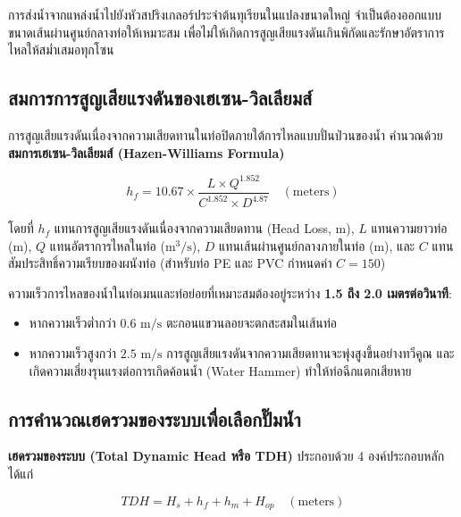 การส่งน้ำจากแหล่งน้ำไปยังหัวสปริงเกลอร์ประจำต้นทุเรียนในแปลงขนาดใหญ่ จำเป็นต้องออกแบบขนาดเส้นผ่านศูนย์กลางท่อให้เหมาะสม เพื่อไม่ให้เกิดการสูญเสียแรงดันเกินพิกัดและรักษาอัตราการไหลให้สม่ำเสมอทุกโซน

\subsection{สมการการสูญเสียแรงดันของเฮเซน-วิลเลียมส์}

การสูญเสียแรงดันเนื่องจากความเสียดทานในท่อปิดภายใต้การไหลแบบปั่นป่วนของน้ำ คำนวณด้วย \textbf{สมการเฮเซน-วิลเลียมส์ (Hazen-Williams Formula)}

\begin{equation}
h_f = 10.67 \times \frac{L \times Q^{1.852}}{C^{1.852} \times D^{4.87}} \quad (\text{meters})
\label{eq:hazen_williams}
\end{equation}

โดยที่ $h_f$ แทนการสูญเสียแรงดันเนื่องจากความเสียดทาน (Head Loss, m), $L$ แทนความยาวท่อ (m), $Q$ แทนอัตราการไหลในท่อ ($\text{m}^3/\text{s}$), $D$ แทนเส้นผ่านศูนย์กลางภายในท่อ (m), และ $C$ แทนสัมประสิทธิ์ความเรียบของผนังท่อ (สำหรับท่อ PE และ PVC กำหนดค่า $C = 150$)

\begin{theorybox}
ความเร็วการไหลของน้ำในท่อเมนและท่อย่อยที่เหมาะสมต้องอยู่ระหว่าง \textbf{1.5 ถึง 2.0 เมตรต่อวินาที}:
\begin{itemize}[leftmargin=1.5em]
    \item หากความเร็วต่ำกว่า $0.6\text{ m/s}$ ตะกอนแขวนลอยจะตกสะสมในเส้นท่อ
    \item หากความเร็วสูงกว่า $2.5\text{ m/s}$ การสูญเสียแรงดันจากความเสียดทานจะพุ่งสูงขึ้นอย่างทวีคูณ และเกิดความเสี่ยงรุนแรงต่อการเกิดค้อนน้ำ (Water Hammer) ทำให้ท่อฉีกแตกเสียหาย
\end{itemize}
\end{theorybox}

\subsection{การคำนวณเฮดรวมของระบบเพื่อเลือกปั๊มน้ำ}

\textbf{เฮดรวมของระบบ (Total Dynamic Head หรือ TDH)} ประกอบด้วย 4 องค์ประกอบหลัก ได้แก่

\begin{equation}
TDH = H_s + h_f + h_m + H_{op} \quad (\text{meters})
\label{eq:tdh}
\end{equation}

